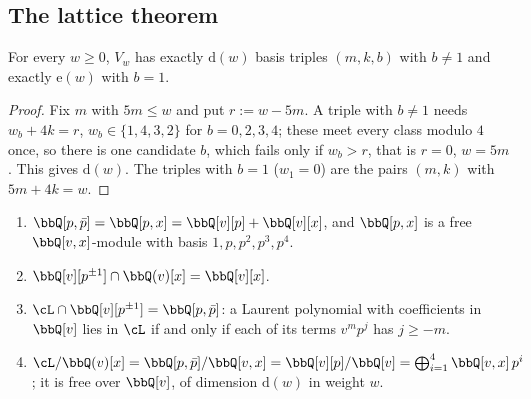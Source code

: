 \subsection{The lattice theorem}
\label{sec:mod-lattice}

\begin{lem}[Counting]
\label{lem:mod-count}
For every $w\geq 0$, $V_w$ has exactly $\mathrm d(w)$ basis triples $(m,k,b)$ with $b\neq 1$ and exactly $\mathrm e(w)$ with $b=1$.
\end{lem}

\begin{proof}
Fix $m$ with $5m\leq w$ and put $r:=w-5m$. A triple with $b\neq 1$ needs $w_b+4k=r$, $w_b\in\{1,4,3,2\}$ for $b=0,2,3,4$; these meet every class modulo $4$ once, so there is one candidate $b$, which fails only if $w_b>r$, that is $r=0$, $w=5m$. This gives $\mathrm d(w)$. The triples with $b=1$ ($w_1=0$) are the pairs $(m,k)$ with $5m+4k=w$.
\end{proof}

\begin{lem}
\label{lem:mod-classL}
\begin{enumerate}
\item $\bbQ[p,\bar p]=\bbQ[p,x]=\bbQ[v][p]+\bbQ[v][x]$, and $\bbQ[p,x]$ is a free $\bbQ[v,x]$-module with basis $1,p,p^2,p^3,p^4$.
\item $\bbQ[v][p^{\pm1}]\cap\bbQ(v)[x]=\bbQ[v][x]$.
\item $\cL\cap\bbQ[v][p^{\pm1}]=\bbQ[p,\bar p]$: a Laurent polynomial with coefficients in $\bbQ[v]$ lies in $\cL$ if and only if each of its terms $v^mp^j$ has $j\geq -m$.
\item $\cL/\bbQ(v)[x]=\bbQ[p,\bar p]/\bbQ[v,x]=\bbQ[v][p]/\bbQ[v]=\bigoplus_{i=1}^4\bbQ[v,x]\,p^i$; it is free over $\bbQ[v]$, of dimension $\mathrm d(w)$ in weight $w$.
\end{enumerate}
\end{lem}

